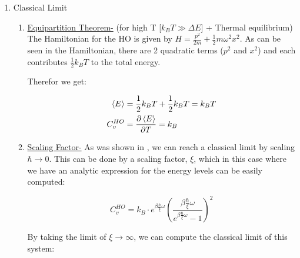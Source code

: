 \documentclass{article}
\numberwithin{equation}{subsection}
\begin{document}
\begin{enumerate}[label=\textbf{\Alph*.}]
\begin{itemize}
        We find that:
        \begin{equation}
            C_v^{HO} = k_B \cdot e^{\beta \hbar \omega} \left( \frac{\beta \hbar \omega}{ e^{\beta \hbar \omega} - 1} \right)^2 =\frac{1}{4}k_B \left[ \beta \hbar \omega \cdot csch \left( \frac{\beta \hbar \omega}{2} \right) \right]^2
        \end{equation}
        
    \end{itemize}
    
\item{Classical Limit}
    
    \begin{enumerate}
        \item \underline{Equipartition Theorem-} (for high T [$k_BT \gg \Delta E$] + Thermal equilibrium)
        The Hamiltonian for the HO is given by $H = \frac{p^2}{2m} + \frac{1}{2} m \omega^2 x^2$. As can be seen in the Hamiltonian, there are 2 quadratic terms ($p^2$ and $x^2$) and each contributes $\frac{1}{2}k_BT$ to the total energy. 
        
        Therefor we get:
        
        \begin{equation}
        \begin{split}
            \expval{E} &= \frac{1}{2}k_BT + \frac{1}{2}k_BT = k_BT 
            \\
            C_v^{HO} &= \frac{\partial \expval{E}}{\partial T} = k_B 
        \end{split}
        \end{equation}
        
        \item \underline{Scaling Factor-} As was shown in \cite{GelbwaserKlimovsky2018}, we can reach a classical limit by scaling $\hbar \rightarrow 0$. This can be done by a scaling factor, $\xi$, which in this case where we have an analytic expression for the energy levels can be easily computed:
        
        \begin{equation}
            C_v^{HO} = k_B \cdot e^{\beta \frac{\hbar}{\xi} \omega} \left( \frac{\beta \frac{\hbar}{\xi} \omega}{ e^{\beta \frac{\hbar}{\xi} \omega} - 1} \right)^2
        \end{equation}
        
        By taking the limit of $\xi\rightarrow \infty$, we can compute the classical limit of this system:
        

\end{enumerate}
\end{enumerate}
\end{document}

